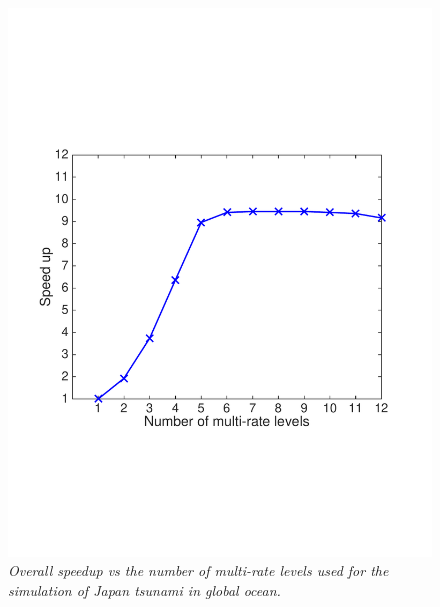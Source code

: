 \begin{figure}[h!]
\begin{center}
\includegraphics[trim=1cm 6cm 2cm 7cm,clip=true,width=0.5\linewidth]{./figures/timeVsLevelsWorldOcean.pdf}
\caption{\emph{Overall speedup vs the number of multi-rate levels used for the simulation of Japan tsunami in global ocean.}}
\label{fig:timeVsLevelsWorldOcean}
\end{center}
\end{figure}



